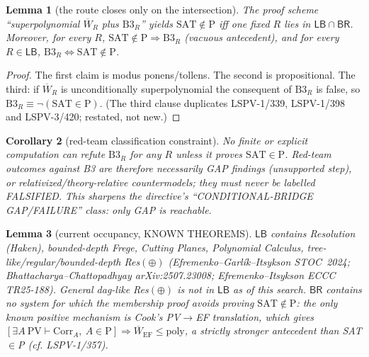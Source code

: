 \documentclass[11pt]{article}
\newtheorem{lemma}{Lemma}
\newtheorem{corollary}[lemma]{Corollary}
\begin{document}
\begin{lemma}[the route closes only on the intersection]\label{l:inter}
The proof scheme ``superpolynomial $\overline W_R$ plus $\mathrm{B3}_R$'' yields
$\mathrm{SAT}\notin\mathrm P$ iff one fixed $R$ lies in
$\mathsf{LB}\cap\mathsf{BR}$. Moreover, for every $R$, $\mathrm{SAT}\notin\mathrm P
\Rightarrow \mathrm{B3}_R$ (vacuous antecedent), and for every
$R\in\mathsf{LB}$, $\mathrm{B3}_R\Leftrightarrow\mathrm{SAT}\notin\mathrm P$.
\end{lemma}
\begin{proof}
The first claim is modus ponens/tollens. The second is propositional. The third:
if $\overline W_R$ is unconditionally superpolynomial the consequent of
$\mathrm{B3}_R$ is false, so $\mathrm{B3}_R\equiv\neg(\mathrm{SAT}\in\mathrm P)$.
(The third clause duplicates LSPV-1/339, LSPV-1/398 and LSPV-3/420; restated, not new.)
\end{proof}

\begin{corollary}[red-team classification constraint]
No finite or explicit computation can \emph{refute} $\mathrm{B3}_R$ for any $R$
unless it proves $\mathrm{SAT}\in\mathrm P$. Red-team outcomes against B3 are
therefore necessarily GAP findings (unsupported step), or relativized/theory-relative
countermodels; they must never be labelled FALSIFIED. This sharpens the
directive's ``CONDITIONAL-BRIDGE GAP/FAILURE'' class: only GAP is reachable.
\end{corollary}

\begin{lemma}[current occupancy, KNOWN THEOREMS]\label{l:occ}
$\mathsf{LB}$ contains Resolution (Haken), bounded-depth Frege, Cutting Planes,
Polynomial Calculus, tree-like/regular/bounded-depth Res$(\oplus)$
(Efremenko--Garl\'ik--Itsykson STOC~2024; Bhattacharya--Chattopadhyay
arXiv:2507.23008; Efremenko--Itsykson ECCC TR25-188). General dag-like Res$(\oplus)$
is \emph{not} in $\mathsf{LB}$ as of this search. $\mathsf{BR}$ contains no
system for which the membership proof avoids proving $\mathrm{SAT}\notin\mathrm P$:
the only known positive mechanism is Cook's PV$\to$EF translation, which gives
$[\exists A\ \mathrm{PV}\vdash\mathrm{Corr}_A,\ A\in\mathrm P]\Rightarrow
\overline W_{\mathrm{EF}}\le\mathrm{poly}$, a strictly stronger antecedent than
SAT$\in$P (cf. LSPV-1/357).
\end{lemma}
\end{document}
